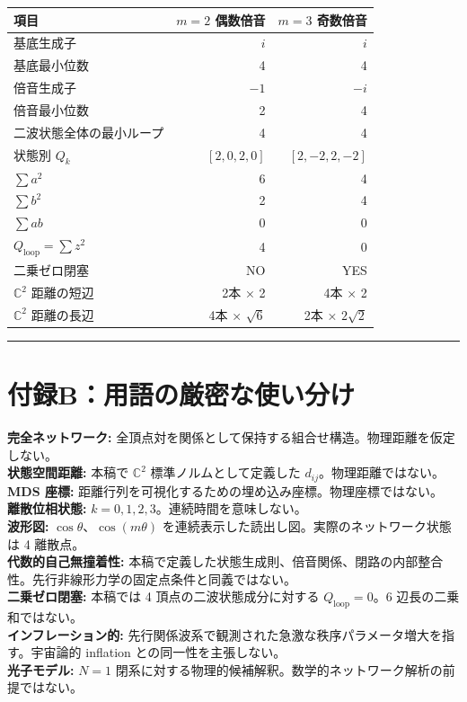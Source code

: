 \documentclass[
  a4paper,
]{ltjsarticle}
\newcounter{none} %
\begin{document}
{\def\LTcaptype{none} %
\begin{longtable}[]{@{}lrr@{}}
\toprule\noalign{}
項目 & \(m=2\) 偶数倍音 & \(m=3\) 奇数倍音 \\
\midrule\noalign{}
\endhead
\bottomrule\noalign{}
\endlastfoot
基底生成子 & \(i\) & \(i\) \\
基底最小位数 & 4 & 4 \\
倍音生成子 & \(-1\) & \(-i\) \\
倍音最小位数 & 2 & 4 \\
二波状態全体の最小ループ & 4 & 4 \\
状態別 \(Q_k\) & \([2,0,2,0]\) & \([2,-2,2,-2]\) \\
\(\sum a^2\) & 6 & 4 \\
\(\sum b^2\) & 2 & 4 \\
\(\sum ab\) & 0 & 0 \\
\(Q_{\mathrm{loop}}=\sum z^2\) & 4 & 0 \\
二乗ゼロ閉塞 & NO & YES \\
\(\mathbb C^2\) 距離の短辺 & 2本 × 2 & 4本 × 2 \\
\(\mathbb C^2\) 距離の長辺 & 4本 × \(\sqrt6\) & 2本 × \(2\sqrt2\) \\
\end{longtable}
}

\begin{center}\rule{0.5\linewidth}{0.5pt}\end{center}

\section{付録B：用語の厳密な使い分け}\label{ux4ed8ux9332bux7528ux8a9eux306eux53b3ux5bc6ux306aux4f7fux3044ux5206ux3051}

\textbf{完全ネットワーク:}
全頂点対を関係として保持する組合せ構造。物理距離を仮定しない。\\
\textbf{状態空間距離:} 本稿で \(\mathbb C^2\) 標準ノルムとして定義した
\(d_{ij}\)。物理距離ではない。\\
\textbf{MDS 座標:}
距離行列を可視化するための埋め込み座標。物理座標ではない。\\
\textbf{離散位相状態:} \(k=0,1,2,3\)。連続時間を意味しない。\\
\textbf{波形図:} \(\cos\theta\)、\(\cos(m\theta)\)
を連続表示した読出し図。実際のネットワーク状態は 4 離散点。\\
\textbf{代数的自己無撞着性:}
本稿で定義した状態生成則、倍音関係、閉路の内部整合性。先行非線形力学の固定点条件と同義ではない。\\
\textbf{二乗ゼロ閉塞:} 本稿では 4 頂点の二波状態成分に対する
\(Q_{\mathrm{loop}}=0\)。6 辺長の二乗和ではない。\\
\textbf{インフレーション的:}
先行関係波系で観測された急激な秩序パラメータ増大を指す。宇宙論的
inflation との同一性を主張しない。\\
\textbf{光子モデル:} \(N=1\)
閉系に対する物理的候補解釈。数学的ネットワーク解析の前提ではない。
\end{document}
